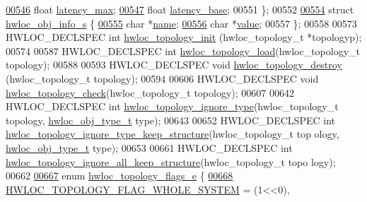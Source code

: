 \begin{DoxyCode}
\hypertarget{a00033_source_l00546}{}\hyperlink{a00014_aab61bd1d1ae2e121bfe793c973ec829e}{00546}   \textcolor{keywordtype}{float} \hyperlink{a00014_aab61bd1d1ae2e121bfe793c973ec829e}{latency_max};            
\hypertarget{a00033_source_l00547}{}\hyperlink{a00014_a204416418049a272bfb51602fc676342}{00547}   \textcolor{keywordtype}{float} \hyperlink{a00014_a204416418049a272bfb51602fc676342}{latency_base};           
00551 \};
00552 
\hypertarget{a00033_source_l00554}{}\hyperlink{a00018}{00554} \textcolor{keyword}{struct }\hyperlink{a00018}{hwloc_obj_info_s} \{
\hypertarget{a00033_source_l00555}{}\hyperlink{a00018_a115dde58f40338a2d3276d59c099857d}{00555}   \textcolor{keywordtype}{char} *\hyperlink{a00018_a115dde58f40338a2d3276d59c099857d}{name};   
\hypertarget{a00033_source_l00556}{}\hyperlink{a00018_a522efd7f5262a4493a73fa3476a041ce}{00556}   \textcolor{keywordtype}{char} *\hyperlink{a00018_a522efd7f5262a4493a73fa3476a041ce}{value};  
00557 \};
00558 
00573 HWLOC\_DECLSPEC \textcolor{keywordtype}{int} \hyperlink{a00043_ga5c2d6f476af87005c7bd0811d4548b9f}{hwloc_topology_init} (hwloc\_topology\_t *topologyp);
00574 
00587 HWLOC\_DECLSPEC \textcolor{keywordtype}{int} \hyperlink{a00043_ga91e2e6427b95fb7339c99dbbef996e71}{hwloc_topology_load}(hwloc\_topology\_t topology);
00588 
00593 HWLOC\_DECLSPEC \textcolor{keywordtype}{void} \hyperlink{a00043_ga6040925d3ee4bbb2647f2a321aca5f4b}{hwloc_topology_destroy} (hwloc\_topology\_t topology);
00594 
00606 HWLOC\_DECLSPEC \textcolor{keywordtype}{void} \hyperlink{a00043_gab3628b2a540a5a08e8cf724ef829e70a}{hwloc_topology_check}(hwloc\_topology\_t topology);
00607 
00642 HWLOC\_DECLSPEC \textcolor{keywordtype}{int} \hyperlink{a00044_gaf2071c8621fddc53649c245d87835b47}{hwloc_topology_ignore_type}(hwloc\_topology\_t topology, 
      \hyperlink{a00041_gacd37bb612667dc437d66bfb175a8dc55}{hwloc_obj_type_t} type);
00643 
00652 HWLOC\_DECLSPEC \textcolor{keywordtype}{int} \hyperlink{a00044_ga6ddd4213d95bd1c30555b294a60efa6b}{hwloc_topology_ignore_type_keep_structure}(hwloc\_topology\_t top
      ology, \hyperlink{a00041_gacd37bb612667dc437d66bfb175a8dc55}{hwloc_obj_type_t} type);
00653 
00661 HWLOC\_DECLSPEC \textcolor{keywordtype}{int} \hyperlink{a00044_gaec6fb00050f50cd41007f1ae580d2106}{hwloc_topology_ignore_all_keep_structure}(hwloc\_topology\_t topo
      logy);
00662 
\hypertarget{a00033_source_l00667}{}\hyperlink{a00044_gada025d3ec20b4b420f8038d23d6e7bde}{00667} \textcolor{keyword}{enum} \hyperlink{a00044_gada025d3ec20b4b420f8038d23d6e7bde}{hwloc_topology_flags_e} \{
\hypertarget{a00033_source_l00668}{}\hyperlink{a00044_ggada025d3ec20b4b420f8038d23d6e7bdea129b4fea1300be22bbaf0bb0958994c8}{00668}   \hyperlink{a00044_ggada025d3ec20b4b420f8038d23d6e7bdea129b4fea1300be22bbaf0bb0958994c8}{HWLOC_TOPOLOGY_FLAG_WHOLE_SYSTEM} = (1<<0),

\end{DoxyCode}
